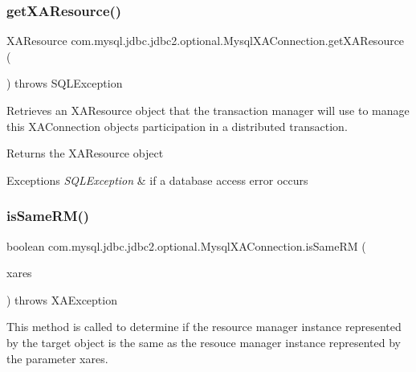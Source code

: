 \subsubsection{\texorpdfstring{get\+X\+A\+Resource()}{getXAResource()}}
{\footnotesize\ttfamily X\+A\+Resource com.\+mysql.\+jdbc.\+jdbc2.\+optional.\+Mysql\+X\+A\+Connection.\+get\+X\+A\+Resource (\begin{DoxyParamCaption}{ }\end{DoxyParamCaption}) throws S\+Q\+L\+Exception}

Retrieves an {\ttfamily X\+A\+Resource} object that the transaction manager will use to manage this {\ttfamily X\+A\+Connection} object\textquotesingle{}s participation in a distributed transaction.

\begin{DoxyReturn}{Returns}
the {\ttfamily X\+A\+Resource} object 
\end{DoxyReturn}

\begin{DoxyExceptions}{Exceptions}
{\em S\+Q\+L\+Exception} & if a database access error occurs \\
\hline
\end{DoxyExceptions}
\mbox{\label{classcom_1_1mysql_1_1jdbc_1_1jdbc2_1_1optional_1_1_mysql_x_a_connection_a352f65f22228587f43c93e280c679496}} 
\subsubsection{\texorpdfstring{is\+Same\+R\+M()}{isSameRM()}}
{\footnotesize\ttfamily boolean com.\+mysql.\+jdbc.\+jdbc2.\+optional.\+Mysql\+X\+A\+Connection.\+is\+Same\+RM (\begin{DoxyParamCaption}\item[{X\+A\+Resource}]{xares }\end{DoxyParamCaption}) throws X\+A\+Exception}

This method is called to determine if the resource manager instance represented by the target object is the same as the resouce manager instance represented by the parameter xares.

